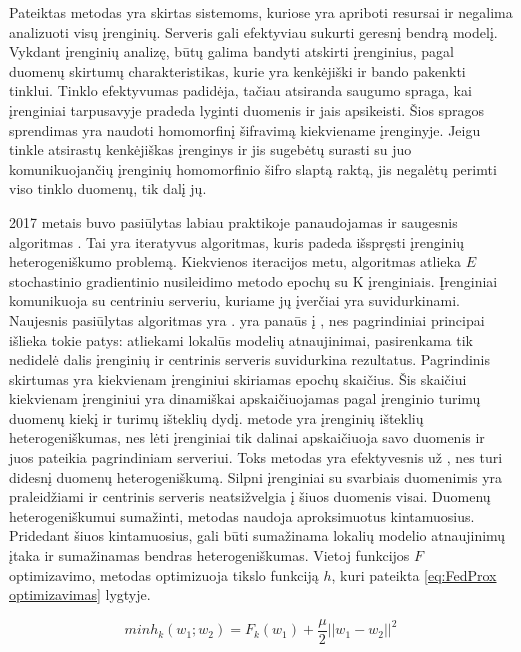 \documentclass{VUMIFInfBakalaurinis}
\begin{document}
\par Pateiktas metodas yra skirtas sistemoms, kuriose yra apriboti resursai ir negalima analizuoti visų įrenginių. Serveris gali efektyviau sukurti geresnį bendrą modelį. Vykdant įrenginių analizę, būtų galima bandyti atskirti įrenginius, pagal duomenų skirtumų charakteristikas, kurie yra kenkėjiški ir bando pakenkti tinklui. Tinklo efektyvumas padidėja, tačiau atsiranda saugumo spraga, kai įrenginiai tarpusavyje pradeda lyginti duomenis ir jais apsikeisti. Šios spragos sprendimas yra naudoti homomorfinį šifravimą kiekviename įrenginyje. Jeigu tinkle atsirastų kenkėjiškas įrenginys ir jis sugebėtų surasti su juo komunikuojančių įrenginių homomorfinio šifro slaptą raktą, jis negalėtų perimti viso tinklo duomenų, tik dalį jų.
\par 2017 metais buvo pasiūlytas labiau praktikoje panaudojamas ir saugesnis  algoritmas \cite{21}. Tai yra iteratyvus algoritmas, kuris padeda išspręsti įrenginių heterogeniškumo problemą. Kiekvienos iteracijos metu, algoritmas atlieka $E$ stochastinio gradientinio nusileidimo metodo epochų su K įrenginiais. Įrenginiai komunikuoja su centriniu serveriu, kuriame jų įverčiai yra suvidurkinami. Naujesnis pasiūlytas algoritmas yra .  yra panaūs į , nes pagrindiniai principai išlieka tokie patys: atliekami lokalūs modelių atnaujinimai, pasirenkama tik nedidelė dalis įrenginių ir centrinis serveris suvidurkina rezultatus. Pagrindinis  skirtumas yra kiekvienam įrenginiui skiriamas epochų skaičius. Šis skaičiui kiekvienam įrenginiui yra dinamiškai apskaičiuojamas pagal įrenginio turimų duomenų kiekį ir turimų išteklių dydį.  metode yra įrenginių išteklių heterogeniškumas, nes lėti įrenginiai tik dalinai apskaičiuoja savo duomenis ir juos pateikia pagrindiniam serveriui. Toks metodas yra efektyvesnis už , nes  turi didesnį duomenų heterogeniškumą. Silpni įrenginiai su svarbiais duomenimis yra praleidžiami ir centrinis serveris neatsižvelgia į šiuos duomenis visai. Duomenų heterogeniškumui sumažinti,  metodas naudoja aproksimuotus kintamuosius. Pridedant šiuos kintamuosius, gali būti sumažinama lokalių modelio atnaujinimų įtaka ir sumažinamas bendras heterogeniškumas. Vietoj funkcijos $F$ optimizavimo, metodas optimizuoja tikslo funkciją $h$, kuri pateikta \eqref{eq:FedProx optimizavimas} lygtyje. 

\begin{equation}
    min h_{k}(w_{1}; w_{2}) = F_{k}(w_{1}) + \frac{\mu}{2}|| w_{1} - w_{2} ||^{2}
    \label{eq:FedProx optimizavimas}
\end{equation}
\end{document}
